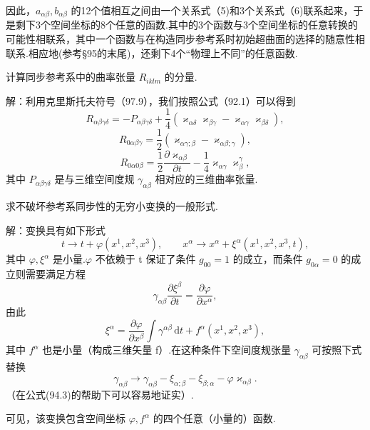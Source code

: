 \begin{xiti}
因此，$a_{\alpha\beta},b_{\alpha\beta}$ 的12个值相互之间由一个关系式（5)和3个关系式（6)联系起来，于是剩下3个空间坐标的8个任意的函数.其中的3个函数与3个空间坐标的任意转换的可能性相联系，其中一个函数与在构造同步参考系时初始超曲面的选择的随意性相联系.相应地(参考§95的末尾)，还剩下4个“物理上不同”的任意函数.

\quad 计算同步参考系中的曲率张量 $R_{iklm}$ 的分量.

解：利用克里斯托夫符号（97.9），我们按照公式（92.1）可以得到
\begin{equation*}
  R_{\alpha\beta\gamma\delta}=-P_{\alpha\beta\gamma\delta}
  +\frac{1}{4}\left(\varkappa_{\alpha\delta}\varkappa_{\beta\gamma}
  -\varkappa_{\alpha\gamma}\varkappa_{\beta\delta}\right),
\end{equation*}
\begin{equation*}
  R_{0\alpha\beta\gamma}
  =\frac{1}{2}\left(\varkappa_{\alpha\gamma;\beta}
  -\varkappa_{\alpha\beta;\gamma}\right),
\end{equation*}
\begin{equation*}
  R_{0\alpha 0\beta}
  =\frac{1}{2}\frac{\partial\varkappa_{\alpha\beta}}{\partial t}
  -\frac{1}{4}\varkappa_{\alpha\gamma}\varkappa_{\beta}^{\gamma},
\end{equation*}
其中 $P_{\alpha\beta\gamma\delta}$ 是与三维空间度规 $\gamma_{\alpha\beta}$ 相对应的三维曲率张量.

\quad 求不破坏参考系同步性的无穷小变换的一般形式.

解：变换具有如下形式
\begin{equation*}
  t\to t+\varphi(x^1,x^2,x^3),\qquad
  x^{\alpha}\to x^{\alpha}+\xi^{\alpha}(x^1,x^2,x^3,t),
\end{equation*}
其中 $\varphi,\xi^{\alpha}$ 是小量.$\varphi$ 不依赖于 t 保证了条件 $g_{00}=1$ 的成立，而条件 $g_{0\alpha}=0$ 的成立则需要满足方程
\begin{equation*}
  \gamma_{\alpha\beta}\frac{\partial\xi^{\beta}}{\partial t}
  =\frac{\partial\varphi}{\partial x^{\alpha}},
\end{equation*}
由此
\begin{equation*}
  \xi^{\alpha}=\frac{\partial\varphi}{\partial x^{\beta}}
  \int\gamma^{\alpha\beta}\,\mathrm{d}t
  +f^{\alpha}(x^1,x^2,x^3),
\tag{1}\end{equation*}
其中 $f^{\alpha}$ 也是小量（构成三维矢量 f）.在这种条件下空间度规张量 $\gamma_{\alpha\beta}$ 可按照下式替换
\begin{equation*}
  \gamma_{\alpha\beta}\to\gamma_{\alpha\beta}
  -\xi_{\alpha;\beta}-\xi_{\beta;\alpha}-\varphi\varkappa_{\alpha\beta}.
\tag{2}\end{equation*}
（在公式(94.3)的帮助下可以容易地证实）.

可见，该变换包含空间坐标 $\varphi,f^{\alpha}$ 的四个任意（小量的）函数.

\end{xiti}

